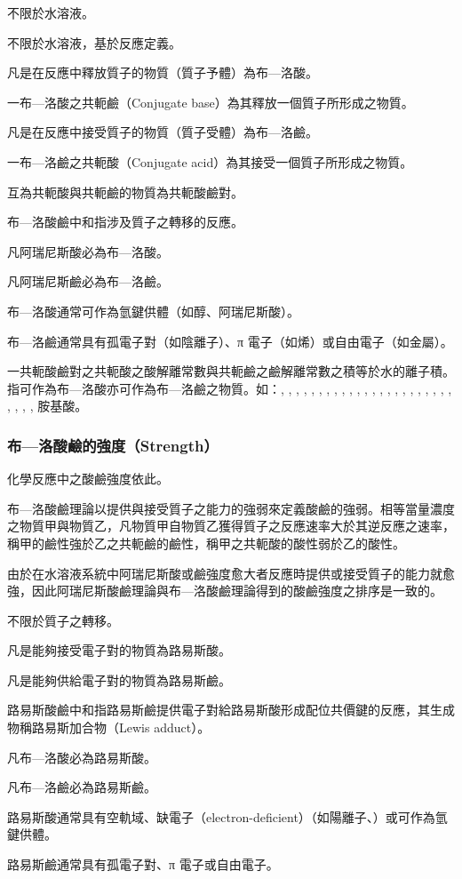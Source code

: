 \documentclass[a4paper,12pt]{article}
\begin{document}
不限於水溶液。
\bit
\item 不限於水溶液，基於反應定義。
\item 凡是在反應中釋放質子的物質（質子予體）為布—洛酸。
\item 一布—洛酸之共軛鹼（Conjugate base）為其釋放一個質子所形成之物質。
\item 凡是在反應中接受質子的物質（質子受體）為布—洛鹼。
\item 一布—洛鹼之共軛酸（Conjugate acid）為其接受一個質子所形成之物質。
\item 互為共軛酸與共軛鹼的物質為共軛酸鹼對。
\item 布—洛酸鹼中和指涉及質子之轉移的反應。
\eit
{}
\bit
\item 凡阿瑞尼斯酸必為布—洛酸。
\item 凡阿瑞尼斯鹼必為布—洛鹼。
\item 布—洛酸通常可作為氫鍵供體（如醇、阿瑞尼斯酸）。
\item 布—洛鹼通常具有孤電子對（如陰離子）、π 電子（如烯）或自由電子（如金屬）。
\item 一共軛酸鹼對之共軛酸之酸解離常數與共軛鹼之鹼解離常數之積等於水的離子積。
\eit
{}
指可作為布—洛酸亦可作為布—洛鹼之物質。如：, , , , , , , , , , , , , , , , , , , , , , , , , , , 胺基酸。
\subsubsection{布—洛酸鹼的強度（Strength）}
化學反應中之酸鹼強度依此。

布—洛酸鹼理論以提供與接受質子之能力的強弱來定義酸鹼的強弱。相等當量濃度之物質甲與物質乙，凡物質甲自物質乙獲得質子之反應速率大於其逆反應之速率，稱甲的鹼性強於乙之共軛鹼的鹼性，稱甲之共軛酸的酸性弱於乙的酸性。

由於在水溶液系統中阿瑞尼斯酸或鹼強度愈大者反應時提供或接受質子的能力就愈強，因此阿瑞尼斯酸鹼理論與布—洛酸鹼理論得到的酸鹼強度之排序是一致的。
\bit
\item 不限於質子之轉移。
\item 凡是能夠接受電子對的物質為路易斯酸。
\item 凡是能夠供給電子對的物質為路易斯鹼。
\item 路易斯酸鹼中和指路易斯鹼提供電子對給路易斯酸形成配位共價鍵的反應，其生成物稱路易斯加合物（Lewis adduct）。
\eit
{}
\bit
\item 凡布—洛酸必為路易斯酸。
\item 凡布—洛鹼必為路易斯鹼。
\item 路易斯酸通常具有空軌域、缺電子（electron-deficient）（如陽離子、）或可作為氫鍵供體。
\item 路易斯鹼通常具有孤電子對、π 電子或自由電子。
\eit
\end{document}
